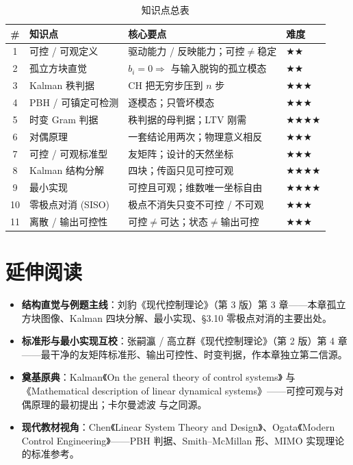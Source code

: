 \begin{table}[H]\centering\small
\caption{知识点总表}
\begin{tabular}{clll}
\toprule
\# & 知识点 & 核心要点 & 难度 \\
\midrule
1 & 可控 / 可观定义 & 驱动能力 / 反映能力；可控$\neq$稳定 & \(\bigstar\bigstar\) \\
2 & 孤立方块直觉 & $b_i=0\Rightarrow$ 与输入脱钩的孤立模态 & \(\bigstar\bigstar\) \\
3 & Kalman 秩判据 & CH 把无穷步压到 $n$ 步 & \(\bigstar\bigstar\bigstar\) \\
4 & PBH / 可镇定可检测 & 逐模态；只管坏模态 & \(\bigstar\bigstar\bigstar\) \\
5 & 时变 Gram 判据 & 秩判据的母判据；LTV 刚需 & \(\bigstar\bigstar\bigstar\bigstar\) \\
6 & 对偶原理 & 一套结论用两次；物理意义相反 & \(\bigstar\bigstar\bigstar\) \\
7 & 可控 / 可观标准型 & 友矩阵；设计的天然坐标 & \(\bigstar\bigstar\bigstar\) \\
8 & Kalman 结构分解 & 四块；传函只见可控可观 & \(\bigstar\bigstar\bigstar\bigstar\) \\
9 & 最小实现 & 可控且可观；维数唯一坐标自由 & \(\bigstar\bigstar\bigstar\bigstar\) \\
10 & 零极点对消 (SISO) & 极点不消失只变不可控 / 不可观 & \(\bigstar\bigstar\bigstar\) \\
11 & 离散 / 输出可控性 & 可控$\neq$可达；状态$\neq$输出可控 & \(\bigstar\bigstar\bigstar\) \\
\bottomrule
\end{tabular}
\end{table}

\section*{延伸阅读}
\begin{itemize}
  \item \textbf{结构直觉与例题主线}：刘豹《现代控制理论》（第 3 版）第 3 章\cite{liubao2006modern}——本章孤立方块图像、Kalman 四块分解、最小实现、§3.10 零极点对消的主要出处。
  \item \textbf{标准形与最小实现互校}：张嗣瀛 / 高立群《现代控制理论》（第 2 版）第 4 章\cite{zhang2017modern}——最干净的友矩阵标准形、输出可控性、时变判据，作本章独立第二信源。
  \item \textbf{奠基原典}：Kalman《On the general theory of control systems》\cite{kalman1960general} 与《Mathematical description of linear dynamical systems》\cite{kalman1963mathematical}——可控可观与对偶原理的最初提出；卡尔曼滤波\cite{kalman1960new} 与之同源。
  \item \textbf{现代教材视角}：Chen《Linear System Theory and Design》\cite{chen1999linear}、Ogata《Modern Control Engineering》\cite{ogata2010modern}——PBH 判据、Smith--McMillan 形、MIMO 实现理论的标准参考。
\end{itemize}

